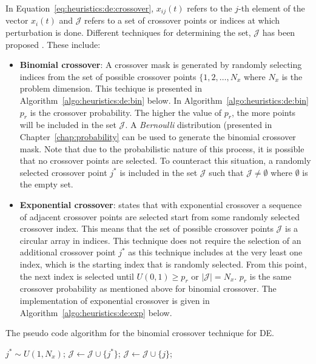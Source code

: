 In Equation~\ref{eq:heuristics:de:crossover}, $x_{ij}(t)$ refers to the $j$-th element of the vector $x_{i}(t)$ and $\mathcal{J}$ refers to a set of crossover points or indices at which perturbation is done. Different techniques for determining the set, $\mathcal{J}$ has been proposed \cite{ref:storn:1996}\cite{ref:storn:1997}. These include:

\begin{itemize}
      \item \textbf{Binomial crossover}: A crossover mask is generated by randomly selecting indices from the set of possible crossover points $\{1,2,\dots,N_{x}$ where $N_{x}$ is the problem dimension. This techique is presented in Algorithm~\ref{algo:heuristics:de:bin} below. In Algorithm~\ref{algo:heuristics:de:bin} $p_{r}$ is the crossover probability. The higher the value of $p_{r}$, the more points will be included in the set $\mathcal{J}$. A \textit{Bernoulli} distribution (presented in Chapter~\ref{chap:probability} can be used to generate the binomial crossover mask. Note that due to the probabilistic nature of this process, it is possible that no crossover points are selected. To counteract this situation, a randomly selected crossover point $j^{*}$ is included in the set $\mathcal{J}$ such that $\mathcal{J} \neq \emptyset$ where $\emptyset$ is the empty set.
      \item \textbf{Exponential crossover}: \citeauthor{ref:engelbrecht:2007}\cite{ref:engelbrecht:2007} states that with exponential crossover a sequence of adjacent crossover points are selected start from some randomly selected crossover index. This means that the set of possible crossover points $\mathcal{J}$ is a circular array in indices. This technique does not require the selection of an additional crossover point $j^{*}$ as this technique includes at the very least one index, which is the starting index that is randomly selected. From this point, the next index is selected until $U(0,1) \geq p_{r}$ or $|\mathcal{J}| = N_{x}$. $p_{r}$ is the same crossover probability as mentioned above for binomial crossover. The implementation of exponential crossover is given in Algorithm~\ref{algo:heuristics:de:exp} below.
\end{itemize}

\begin{algorithm}[H]
      \caption{The pseudo code algorithm for the binomial crossover technique for \ac{DE}.}
      \label{algo:heuristics:de:bin}
      \begin{algorithmic}
            \State $j^{*} \sim U(1,N_{x})$;
            \State $\mathcal{J} \gets \mathcal{J} \cup \{j^{*}\}$;
            \State $\mathcal{J} \gets \mathcal{J} \cup \{j\}$;
            \EndIf
            \EndFor
      \end{algorithmic}
\end{algorithm}

